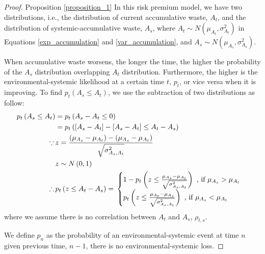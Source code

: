 \documentclass[sn-basic]{sn-jnl}%
\theoremstyle{thmstyleone}%
\theoremstyle{thmstyletwo}%
\theoremstyle{thmstylethree}%
\begin{document}
\begin{proof}{Proposition \ref{proposition_1}}
	In this risk premium model, we have two distributions, i.e., the distribution of current accumulative waste, $A_t$, and the distribution of systemic-accumulative waste, $A_s$, where $A_t\sim N\left(\mu_{A_t},\sigma_{A_t}^2\right)$ in Equations \ref{exp_accumulation} and \ref{var_accumulation}, and $A_s\sim N\left(\mu_{A_s},\sigma_{A_s}^2\right)$.
	
	When accumulative waste worsens,  the longer the time, the higher the probability of the $A_s$ distribution overlapping $A_t$ distribution. Furthermore, the higher is the environmental-systemic likelihood at a certain time $t$, $p_{t}$, or vice versa when it is improving. To find $p_{t}\left(A_s\leq A_t\right)$, we use the subtraction of two distributions as follow:
	\begin{align}\label{prob_systemic}
		p_{t}\left(A_s\leq A_t\right)&=p_{t}\left(A_s-A_t\leq 0\right) \notag\\
		&=p_{t}\left(\left[A_s-A_t\right]-\left[A_s-A_t\right]\leq A_t-A_s\right) \notag\\
		\because \,& z=\frac{\left(\mu_{A_s}-\mu_{A_t}\right)-\left(\mu_{A_s}-\mu_{A_t}\right)}{\sqrt{\sigma_{A_s,A_t}^2}} \notag\\
		& z \sim  N\left(0,1\right) \notag \\
		\therefore \, & p_{t}\left(z\leq A_t-A_s\right)= \,
		\begin{cases}
			1-p_{t}\left(z\leq \frac{\mu_{A_s}-\mu_{A_t}}{\sqrt{\sigma_{A_s,A_t}^2}}\right) \text{ , if } \mu_{A_s}>\mu_{A_t} \\
			p_{t}\left(z\leq \frac{\mu_{A_t}-\mu_{A_s}}{\sqrt{\sigma_{A_s,A_t}^2}}\right) \text{ , if } \mu_{A_s}<\mu_{A_t} \\
		\end{cases}
	\end{align}
	where we assume there is no correlation between $A_t$ and $A_s$, $\rho_{t,s}$.

	We define $p_{n}$ as the probability of an environmental-systemic event at time $n$ given previous time, $n-1$, there is no environmental-systemic loss. 


\end{proof}
\end{document}
